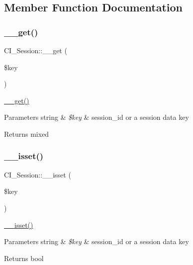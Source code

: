 \subsection{Member Function Documentation}
\mbox{\label{class_c_i___session_a9026ff262ce89e9194481fbf2fb47b36}} 
\subsubsection{\texorpdfstring{\+\_\+\+\_\+get()}{\_\_get()}}
{\footnotesize\ttfamily C\+I\+\_\+\+Session\+::\+\_\+\+\_\+get (\begin{DoxyParamCaption}\item[{}]{\$key }\end{DoxyParamCaption})}

\mbox{\hyperlink{class_c_i___session_a9026ff262ce89e9194481fbf2fb47b36}{\+\_\+\+\_\+get()}}


\begin{DoxyParams}[1]{Parameters}
string & {\em \$key} & \textquotesingle{}session\+\_\+id\textquotesingle{} or a session data key \\
\hline
\end{DoxyParams}
\begin{DoxyReturn}{Returns}
mixed 
\end{DoxyReturn}
\mbox{\label{class_c_i___session_a657f218c2cf06f8e8f9896e5ebdb3c9e}} 
\subsubsection{\texorpdfstring{\+\_\+\+\_\+isset()}{\_\_isset()}}
{\footnotesize\ttfamily C\+I\+\_\+\+Session\+::\+\_\+\+\_\+isset (\begin{DoxyParamCaption}\item[{}]{\$key }\end{DoxyParamCaption})}

\mbox{\hyperlink{class_c_i___session_a657f218c2cf06f8e8f9896e5ebdb3c9e}{\+\_\+\+\_\+isset()}}


\begin{DoxyParams}[1]{Parameters}
string & {\em \$key} & \textquotesingle{}session\+\_\+id\textquotesingle{} or a session data key \\
\hline
\end{DoxyParams}
\begin{DoxyReturn}{Returns}
bool 
\end{DoxyReturn}
\mbox{\label{class_c_i___session_a679db94c08024d509f14d7c0ffef7feb}} 
